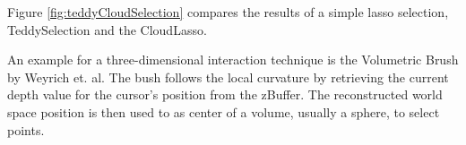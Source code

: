 Figure \ref{fig:teddyCloudSelection} compares the results of a simple lasso selection, TeddySelection and the CloudLasso. 




An example for a three-dimensional interaction technique is the Volumetric Brush by Weyrich et. al\cite{weyrich2004post}. The bush follows the local curvature by retrieving the current depth value for the cursor's position from the zBuffer. The reconstructed world space position is then used to as center of a volume, usually a sphere, to select points. 
